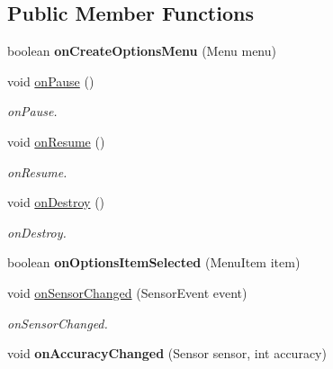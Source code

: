 \subsection*{Public Member Functions}
\begin{DoxyCompactItemize}
\item 
boolean {\bfseries on\+Create\+Options\+Menu} (Menu menu)\hypertarget{classio_1_1github_1_1samshore_1_1clientapp_1_1_main_activity_a4b07c90c6171135421905a0d56326c77}{}\label{classio_1_1github_1_1samshore_1_1clientapp_1_1_main_activity_a4b07c90c6171135421905a0d56326c77}

\item 
void \hyperlink{classio_1_1github_1_1samshore_1_1clientapp_1_1_main_activity_ae9ab0369c38935220ea2afe34667190f}{on\+Pause} ()
\begin{DoxyCompactList}\small\item\em on\+Pause. \end{DoxyCompactList}\item 
void \hyperlink{classio_1_1github_1_1samshore_1_1clientapp_1_1_main_activity_a25bab307b40df615f2b3e4817fa7333a}{on\+Resume} ()
\begin{DoxyCompactList}\small\item\em on\+Resume. \end{DoxyCompactList}\item 
void \hyperlink{classio_1_1github_1_1samshore_1_1clientapp_1_1_main_activity_a78362fe947b71745669c2d0e48967b78}{on\+Destroy} ()
\begin{DoxyCompactList}\small\item\em on\+Destroy. \end{DoxyCompactList}\item 
boolean {\bfseries on\+Options\+Item\+Selected} (Menu\+Item item)\hypertarget{classio_1_1github_1_1samshore_1_1clientapp_1_1_main_activity_a29caf5c7fe95d346d339960be3996b64}{}\label{classio_1_1github_1_1samshore_1_1clientapp_1_1_main_activity_a29caf5c7fe95d346d339960be3996b64}

\item 
void \hyperlink{classio_1_1github_1_1samshore_1_1clientapp_1_1_main_activity_a0bf0e6c30da2a6e1f967e77e239f1afd}{on\+Sensor\+Changed} (Sensor\+Event event)
\begin{DoxyCompactList}\small\item\em on\+Sensor\+Changed. \end{DoxyCompactList}\item 
void {\bfseries on\+Accuracy\+Changed} (Sensor sensor, int accuracy)\hypertarget{classio_1_1github_1_1samshore_1_1clientapp_1_1_main_activity_a3f2e52f76e0fbb65332bc843e77ad82c}{}\label{classio_1_1github_1_1samshore_1_1clientapp_1_1_main_activity_a3f2e52f76e0fbb65332bc843e77ad82c}


\end{DoxyCompactItemize}
